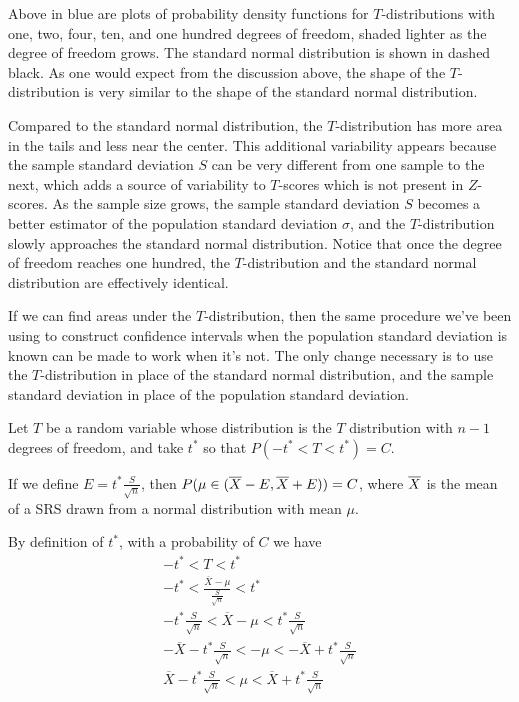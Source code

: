 \par
Above in blue are plots of probability density functions for $T$-distributions with one, two, four, ten, and one hundred degrees of freedom, shaded lighter as the degree of freedom grows. The standard normal distribution is shown in dashed black. As one would expect from the discussion above, the shape of the $T$-distribution is very similar to the shape of the standard normal distribution.
\par 
Compared to the standard normal distribution, the $T$-distribution has more area in the tails and less near the center. This additional variability appears because the sample standard deviation $S$ can be very different from one sample to the next, which adds a source of variability to $T$-scores which is not present in $Z$-scores. As the sample size grows, the sample standard deviation $S$ becomes a better estimator of the population standard deviation $\sigma$, and the $T$-distribution slowly approaches the standard normal distribution. Notice that once the degree of freedom reaches one hundred, the $T$-distribution and the standard normal distribution are effectively identical.
\par
If we can find areas under the $T$-distribution, then the same procedure we've been using to construct confidence intervals when the population standard deviation is known can be made to work when it's not. The only change necessary is to use the $T$-distribution in place of the standard normal distribution, and the sample standard deviation in place of the population standard deviation.
\par
\begin{prop}Let $T$ be a random variable whose distribution is the $T$ distribution with $n-1$ degrees of freedom, and take $t^*$ so that $P(-t^* < T < t^*) = C$.
\par
\noindent If we define $E = t^*\frac{S}{\sqrt{n}}$, then $P(\mu \in ({\overline{X}} - E, {\overline{X}} + E)) = C$, where ${\overline{X}}$ is the mean of a SRS drawn from a normal distribution with mean $\mu$.
\end{prop}
\begin{pf}
By definition of $t^*$, with a probability of $C$ we have
\begin{gather*}
-t^* < T < t^* \\
-t^* < \textstyle\frac{\overline{X}- \mu}{\frac{S}{\sqrt{n}}} < t^* \\
-t^* \textstyle\frac{S}{\sqrt{n}} < \overline{X}- \mu < t^* \frac{S}{\sqrt{n}} \\[0.2ex]
-\overline{X}-t^* \textstyle\frac{S}{\sqrt{n}} < - \mu < -\overline{X}+t^* \frac{S}{\sqrt{n}} \\[0.3ex]
\overline{X}-t^* \textstyle\frac{S}{\sqrt{n}} <  \mu < \overline{X}+t^* \frac{S}{\sqrt{n}}
\end{gather*}
\end{pf}
